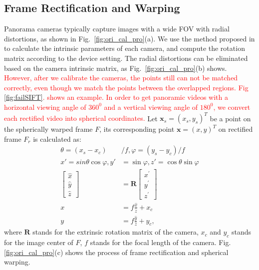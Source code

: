 \documentclass[conference]{IEEEtran}
\begin{document}
\subsection{Frame Rectification and Warping}
\label{ssec:Pre-prepared}

Panorama cameras typically capture images with a wide FOV with radial distortions, as shown in Fig.~\ref{fig:ori_cal_pro}(a).
We use the method proposed in \cite{zhang2000flexible} to calculate the intrinsic parameters of each camera, and compute the rotation matrix according to the device setting. 
The radial distortions can be eliminated based on the camera intrinsic matrix, as Fig.~\ref{fig:ori_cal_pro}(b) shows.
\textcolor{red}{However, after we calibrate the cameras, the points still can not be matched correctly,
even though we match the points between the overlapped regions.
Fig \ref{fig:failSIFT}. shows an example.}
\textcolor{red}{In order to get panoramic videos with a horizontal viewing angle of $360^0$ and a vertical viewing angle of $180^0$,
we convert each rectified video into spherical coordinates.}
Let $\mathbf{x}_{s} = (x_{s},y_{s})^T$ be a point on the spherically
warped frame $F$, its corresponding point $\mathbf{x} = (x, y)^T$ on rectified frame $F_r$ is calculated as:
\begin{equation}
\begin{aligned}
\theta =\left(x_{s}-x_{c}\right) &/ f , \varphi =\left(y_{s} -y_{c}\right) / f \\
x'=sin\theta \cos\varphi, y'&=\sin\varphi, z'=\cos\theta \sin\varphi \\
\left[ \begin{array}{l}{\hat{x}} \\ {\hat{y}} \\ {\hat{z}}\end{array}\right]&=\textbf{R} \left[ \begin{array}{l}{x^{\prime}} \\ {y^{\prime}} \\ {z^{\prime}}\end{array}\right]\\
x&=f\frac{\hat{x}}{\hat{z}}+x_c\\
y&=f\frac{\hat{y}}{\hat{z}}+y_c,
\end{aligned}
\end{equation}
where $\textbf{R}$ stands for the extrinsic rotation matrix of the camera, $x_c$ and $y_c$ stands for the image center of $F$, $f$ stands for the focal length of the camera.
Fig. \ref{fig:ori_cal_pro}(c) shows the process of frame rectification and spherical warping. 
\end{document}
